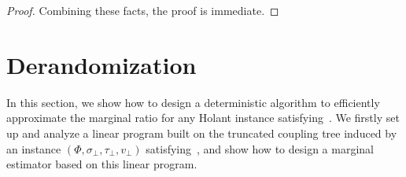 \documentclass[11pt]{article}
\newcommand{\abs}[1]{\left\vert#1\right\vert}
\newcommand{\set}[1]{\left\{#1\right\}}
\renewcommand{\mid}{\;\middle\vert\;} \newcommand{\cmid}{\,:\,}
\def\!#1{\mathtt{#1}}
\newcommand{\seqS}{\boldsymbol{s}}
\renewcommand{\Pr}[2][]{ \ifthenelse{\isempty{#1}}
  {\mathbf{Pr}\left[#2\right]} {\mathbf{Pr}_{#1}\left[#2\right]} }
\begin{document}
\begin{proof}
     Combining these facts, the proof is immediate.
    \end{proof}


    
   
    
\section{Derandomization}

In this section, we show how to design a deterministic algorithm to efficiently approximate the marginal ratio for any Holant instance satisfying~. We firstly set up and analyze a linear program built on the truncated coupling tree induced by an instance $(\Phi, \sigma_\bot, \tau_\bot, v_\bot)$ satisfying~, and show how to design a marginal estimator based on this linear program.

\end{document}
